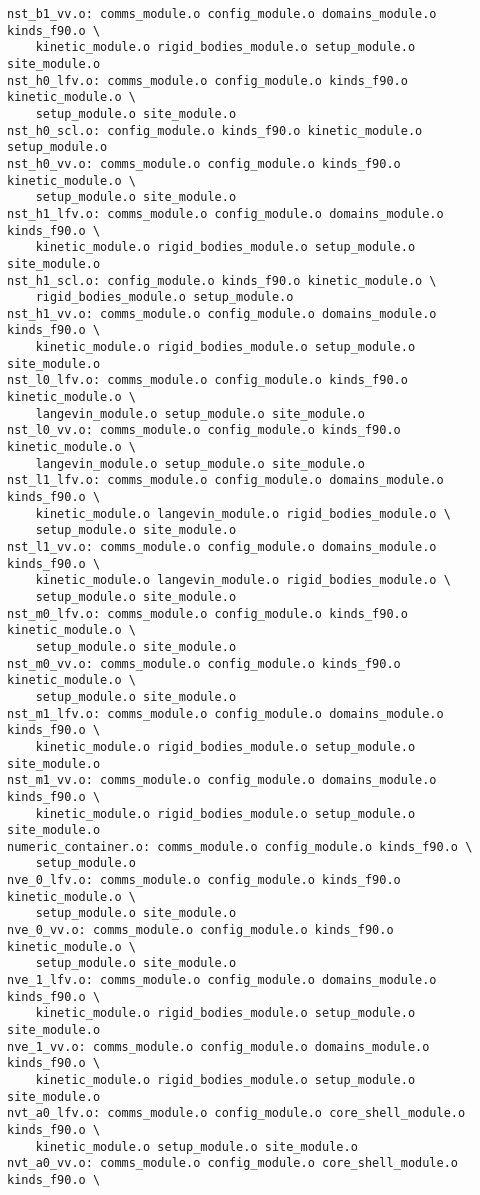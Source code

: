 \begin{verbatim}
nst_b1_vv.o: comms_module.o config_module.o domains_module.o kinds_f90.o \
	kinetic_module.o rigid_bodies_module.o setup_module.o site_module.o
nst_h0_lfv.o: comms_module.o config_module.o kinds_f90.o kinetic_module.o \
	setup_module.o site_module.o
nst_h0_scl.o: config_module.o kinds_f90.o kinetic_module.o setup_module.o
nst_h0_vv.o: comms_module.o config_module.o kinds_f90.o kinetic_module.o \
	setup_module.o site_module.o
nst_h1_lfv.o: comms_module.o config_module.o domains_module.o kinds_f90.o \
	kinetic_module.o rigid_bodies_module.o setup_module.o site_module.o
nst_h1_scl.o: config_module.o kinds_f90.o kinetic_module.o \
	rigid_bodies_module.o setup_module.o
nst_h1_vv.o: comms_module.o config_module.o domains_module.o kinds_f90.o \
	kinetic_module.o rigid_bodies_module.o setup_module.o site_module.o
nst_l0_lfv.o: comms_module.o config_module.o kinds_f90.o kinetic_module.o \
	langevin_module.o setup_module.o site_module.o
nst_l0_vv.o: comms_module.o config_module.o kinds_f90.o kinetic_module.o \
	langevin_module.o setup_module.o site_module.o
nst_l1_lfv.o: comms_module.o config_module.o domains_module.o kinds_f90.o \
	kinetic_module.o langevin_module.o rigid_bodies_module.o \
	setup_module.o site_module.o
nst_l1_vv.o: comms_module.o config_module.o domains_module.o kinds_f90.o \
	kinetic_module.o langevin_module.o rigid_bodies_module.o \
	setup_module.o site_module.o
nst_m0_lfv.o: comms_module.o config_module.o kinds_f90.o kinetic_module.o \
	setup_module.o site_module.o
nst_m0_vv.o: comms_module.o config_module.o kinds_f90.o kinetic_module.o \
	setup_module.o site_module.o
nst_m1_lfv.o: comms_module.o config_module.o domains_module.o kinds_f90.o \
	kinetic_module.o rigid_bodies_module.o setup_module.o site_module.o
nst_m1_vv.o: comms_module.o config_module.o domains_module.o kinds_f90.o \
	kinetic_module.o rigid_bodies_module.o setup_module.o site_module.o
numeric_container.o: comms_module.o config_module.o kinds_f90.o \
	setup_module.o
nve_0_lfv.o: comms_module.o config_module.o kinds_f90.o kinetic_module.o \
	setup_module.o site_module.o
nve_0_vv.o: comms_module.o config_module.o kinds_f90.o kinetic_module.o \
	setup_module.o site_module.o
nve_1_lfv.o: comms_module.o config_module.o domains_module.o kinds_f90.o \
	kinetic_module.o rigid_bodies_module.o setup_module.o site_module.o
nve_1_vv.o: comms_module.o config_module.o domains_module.o kinds_f90.o \
	kinetic_module.o rigid_bodies_module.o setup_module.o site_module.o
nvt_a0_lfv.o: comms_module.o config_module.o core_shell_module.o kinds_f90.o \
	kinetic_module.o setup_module.o site_module.o
nvt_a0_vv.o: comms_module.o config_module.o core_shell_module.o kinds_f90.o \

\end{verbatim}
